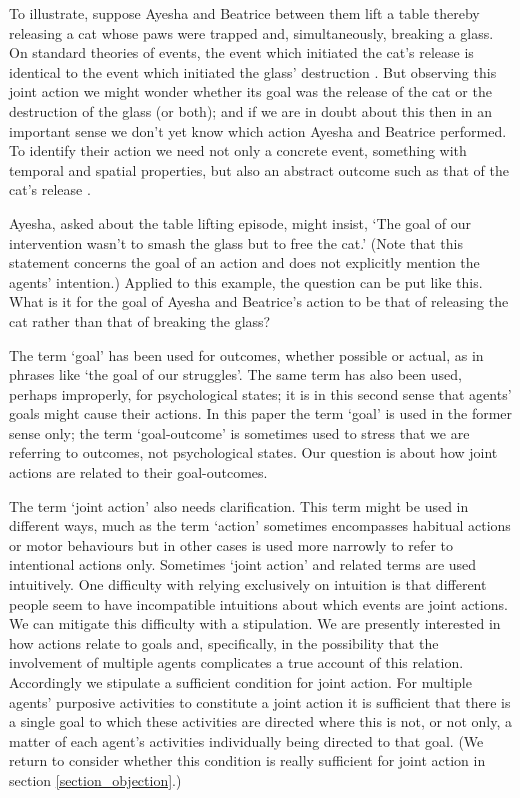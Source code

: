 \documentclass[12pt,a4paper]{extarticle}
\begin{document}
To illustrate, suppose Ayesha and Beatrice between them lift a table thereby releasing a cat whose paws were trapped and,  simultaneously, breaking a glass.  On standard theories of events, the event which initiated the cat's release is identical to the event which initiated the glass' destruction \citep{Davidson:1969ie}.  But observing this joint action we might wonder whether its goal was the release of the cat or the destruction of the glass (or both); and if we are in doubt about this then in an important sense we don't yet know which action Ayesha and Beatrice performed.  To identify their action we need not only a concrete event, something with temporal and spatial properties, but also an abstract outcome such as that of the cat's release \citep{Davidson:1971fz}.

Ayesha, asked about the table lifting episode, might insist, `The goal of our intervention wasn't to smash the glass but to free the cat.'  (Note that this statement concerns the goal of an action and does not explicitly mention the agents' intention.)  Applied to this example, the question can be put like this.  What is it for the goal of Ayesha and Beatrice's action to be that of releasing the cat rather than that of breaking the glass?

The term `goal' has been used for outcomes, whether possible or actual, as in phrases like `the goal of our struggles'.  The same term has also been used, perhaps improperly, for psychological states; it is in this second sense that agents' goals might cause their actions.  In this paper the term `goal' is used in the former sense only; the term `goal-outcome' is sometimes used to stress that we are referring to outcomes, not psychological states.  Our question is about how joint actions are related to their goal-outcomes.  

The term `joint action' also needs clarification.  This term might be used in different ways, much as the term `action' sometimes encompasses habitual actions or motor behaviours but in other cases is used more narrowly to refer to intentional actions only.  
Sometimes `joint action' and related terms are used intuitively.
One difficulty with relying exclusively on intuition is that different people seem to have incompatible intuitions about which events are joint actions.
We can mitigate this difficulty with a stipulation.
We are presently interested in how actions relate to goals and, specifically, in the possibility that the involvement of multiple agents complicates a true account of this relation.  Accordingly we stipulate a sufficient condition for joint action.  For multiple agents' purposive activities to constitute a joint action it is sufficient that there is a single goal to which these activities are directed where this is not, or not only, a matter of each agent's activities individually being directed to that goal.   
(We return to consider whether this condition is really sufficient for joint action in section \vref{section_objection}.)
\end{document}
